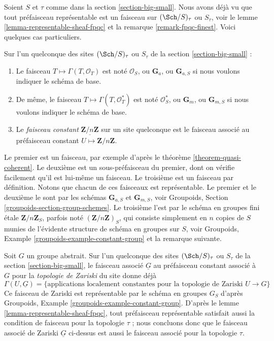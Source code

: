 \noindent
Soient $S$ et $\tau$ comme dans la section \ref{section-big-small}.
Nous avons d\'ej\`a vu que tout pr\'efaisceau repr\'esentable est un faisceau sur
$(\Sch/S)_\tau$ ou $S_\tau$, voir
le lemme \ref{lemma-representable-sheaf-fpqc}
et la
remarque \ref{remark-fpqc-finest}.
Voici quelques cas particuliers.

\begin{definition}
\label{definition-additive-sheaf}
Sur l'un quelconque des sites $(\Sch/S)_\tau$ ou $S_\tau$ de la
section \ref{section-big-small} :
\begin{enumerate}
\item Le faisceau $T \mapsto \Gamma(T, \mathcal{O}_T)$ est not\'e
$\mathcal{O}_S$, ou $\mathbf{G}_a$, ou $\mathbf{G}_{a, S}$ si nous
voulons indiquer le sch\'ema de base.
\item De m\^eme, le faisceau
$T \mapsto \Gamma(T, \mathcal{O}^*_T)$ est not\'e $\mathcal{O}_S^*$, ou
$\mathbf{G}_m$, ou $\mathbf{G}_{m, S}$ si nous voulons
indiquer le sch\'ema de base.
\item Le {\it faisceau constant} $\underline{\mathbf{Z}/n\mathbf{Z}}$ sur un
site quelconque est le faisceau associ\'e au pr\'efaisceau constant
$U \mapsto \mathbf{Z}/n\mathbf{Z}$.
\end{enumerate}
\end{definition}

\noindent
Le premier est un faisceau, par exemple d'apr\`es le
th\'eor\`eme \ref{theorem-quasi-coherent}.
Le deuxi\`eme est un sous-pr\'efaisceau du premier, dont on v\'erifie facilement
qu'il est lui-m\^eme un faisceau. Le troisi\`eme est un faisceau par d\'efinition.
Notons que chacun de ces faisceaux est repr\'esentable.
Le premier et le deuxi\`eme le sont par les sch\'emas $\mathbf{G}_{a, S}$ et
$\mathbf{G}_{m, S}$, voir
Groupoids, Section \ref{groupoids-section-group-schemes}.
Le troisi\`eme l'est par le sch\'ema en groupes fini \'etale $\mathbf{Z}/n\mathbf{Z}_S$,
parfois not\'e $(\mathbf{Z}/n\mathbf{Z})_S$,
qui consiste simplement en $n$ copies de $S$ munies
de l'\'evidente structure de sch\'ema en groupes sur $S$, voir
Groupoids, Example \ref{groupoids-example-constant-group}
et la remarque suivante.

\begin{remark}
\label{remark-constant-locally-constant-maps}
Soit $G$ un groupe abstrait.
Sur l'un quelconque des sites $(\Sch/S)_\tau$ ou $S_\tau$ de la
section \ref{section-big-small},
le faisceau associ\'e $\underline{G}$
au pr\'efaisceau constant associ\'e \`a $G$ pour la
{\it topologie de Zariski} du site donne d\'ej\`a
$$
\Gamma(U, \underline{G}) =
\{\text{applications localement constantes pour la topologie de Zariski }U \to G\}
$$
Ce faisceau de Zariski est repr\'esentable par le sch\'ema en groupes $G_S$ d'apr\`es
Groupoids, Example \ref{groupoids-example-constant-group}.
D'apr\`es le
lemme \ref{lemma-representable-sheaf-fpqc},
tout pr\'efaisceau repr\'esentable satisfait aussi la condition de faisceau pour la
topologie $\tau$ ; nous concluons donc que le faisceau associ\'e de Zariski
$\underline{G}$ ci-dessus est aussi le faisceau associ\'e pour la topologie $\tau$.
\end{remark}

